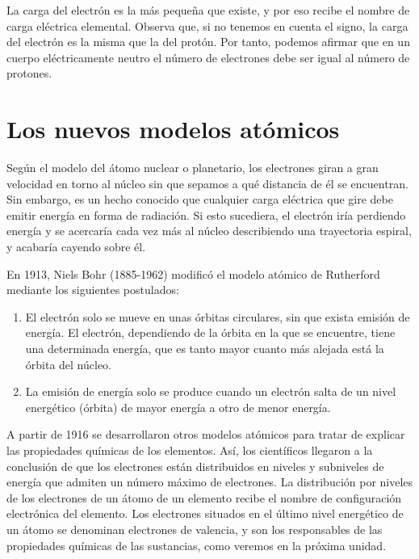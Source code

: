 \documentclass[
  spanish,
]{article}
\providecommand{\tightlist}{%
  \setlength{\itemsep}{0pt}\setlength{\parskip}{0pt}}
\begin{document}
La carga del electrón es la más pequeña que existe, y por eso recibe el
nombre de carga eléctrica elemental. Observa que, si no tenemos en
cuenta el signo, la carga del electrón es la misma que la del protón.
Por tanto, podemos afirmar que en un cuerpo eléctricamente neutro el
número de electrones debe ser igual al número de protones.

\hypertarget{los-nuevos-modelos-atuxf3micos}{%
\section{Los nuevos modelos
atómicos}\label{los-nuevos-modelos-atuxf3micos}}

Según el modelo del átomo nuclear o planetario, los electrones giran a
gran velocidad en torno al núcleo sin que sepamos a qué distancia de él
se encuentran. Sin embargo, es un hecho conocido que cualquier carga
eléctrica que gire debe emitir energía en forma de radiación. Si esto
sucediera, el electrón iría perdiendo energía y se acercaría cada vez
más al núcleo describiendo una trayectoria espiral, y acabaría cayendo
sobre él.

En 1913, Niels Bohr (1885-1962) modificó el modelo atómico de Rutherford
mediante los siguientes postulados:

\begin{enumerate}
\def\labelenumi{\arabic{enumi})}
\tightlist
\item
  El electrón solo se mueve en unas órbitas circulares, sin que exista
  emisión de energía. El electrón, dependiendo de la órbita en la que se
  encuentre, tiene una determinada energía, que es tanto mayor cuanto
  más alejada está la órbita del núcleo.
\item
  La emisión de energía solo se produce cuando un electrón salta de un
  nivel energético (órbita) de mayor energía a otro de menor energía.
\end{enumerate}

A partir de 1916 se desarrollaron otros modelos atómicos para tratar de
explicar las propiedades químicas de los elementos. Así, los científicos
llegaron a la conclusión de que los electrones están distribuidos en
niveles y subniveles de energía que admiten un número máximo de
electrones. La distribución por niveles de los electrones de un átomo de
un elemento recibe el nombre de configuración electrónica del elemento.
Los electrones situados en el último nivel energético de un átomo se
denominan electrones de valencia, y son los responsables de las
propiedades químicas de las sustancias, como veremos en la próxima
unidad.
\end{document}
